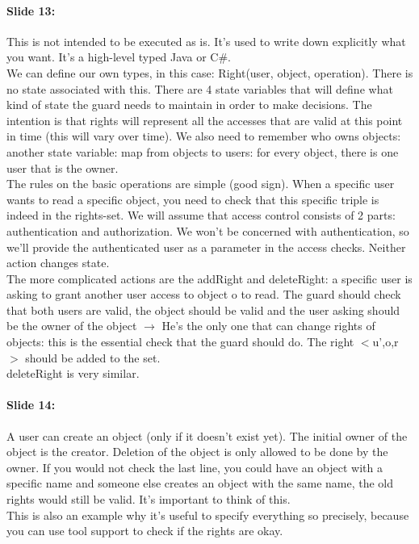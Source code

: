 \documentclass[10pt,a4paper]{report}
\begin{document}
\paragraph{Slide 13:} This is not intended to be executed as is. It's used to write down explicitly what you want. It's a high-level typed Java or C\#.\\
We can define our own types, in this case: Right(user, object, operation). There is no state associated with this. There are 4 state variables that will define what kind of state the guard needs to maintain in order to make decisions. The intention is that rights will represent all the accesses that are valid at this point in time (this will vary over time). We also need to remember who owns objects: another state variable: map from objects to users: for every object, there is one user that is the owner.\\
The rules on the basic operations are simple (good sign). When a specific user wants to read a specific object, you need to check that this specific triple is indeed in the rights-set. We will assume that access control consists of 2 parts: authentication and authorization. We won't be concerned with authentication, so we'll provide the authenticated user as a parameter in the access checks. Neither action changes state.\\
The more complicated actions are the addRight and deleteRight: a specific user is asking to grant another user access to object o to read. The guard should check that both users are valid, the object should be valid and the user asking should be the owner of the object $\rightarrow$ He's the only one that can change rights of objects: this is the essential check that the guard should do.
The right $<$u',o,r$>$ should be added to the set. \\
deleteRight is very similar. 

\paragraph{Slide 14:} A user can create an object (only if it doesn't exist yet). The initial owner of the object is the creator. Deletion of the object is only allowed to be done by the owner. If you would not check the last line, you could have an object with a specific name and someone else creates an object with the same name, the old rights would still be valid. It's important to think of this.\\
This is also an example why it's useful to specify everything so precisely, because you can use tool support to check if the rights are okay. 
\end{document}
